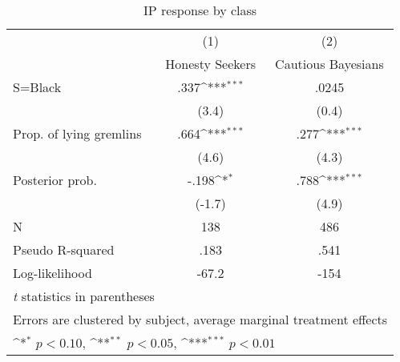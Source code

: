 \begin{table}[htbp]\centering
\def\sym#1{\ifmmode^{#1}\else\(^{#1}\)\fi}
\caption{IP response by class}
\begin{tabular}{l*{2}{c}}
\hline\hline
                &\multicolumn{1}{c}{(1)}&\multicolumn{1}{c}{(2)}\\
                &\multicolumn{1}{c}{Honesty Seekers}&\multicolumn{1}{c}{Cautious Bayesians}\\
\hline
S=Black         &     .337\sym{***}&    .0245         \\
                &    (3.4)         &    (0.4)         \\
Prop. of lying gremlins&     .664\sym{***}&     .277\sym{***}\\
                &    (4.6)         &    (4.3)         \\
Posterior prob. &    -.198\sym{*}  &     .788\sym{***}\\
                &   (-1.7)         &    (4.9)         \\
\hline
N               &      138         &      486         \\
Pseudo R-squared&     .183         &     .541         \\
Log-likelihood  &    -67.2         &     -154         \\
\hline\hline
\multicolumn{3}{l}{\footnotesize \textit{t} statistics in parentheses}\\
\multicolumn{3}{l}{\footnotesize Errors are clustered by subject, average marginal treatment effects}\\
\multicolumn{3}{l}{\footnotesize \sym{*} \(p<0.10\), \sym{**} \(p<0.05\), \sym{***} \(p<0.01\)}\\
\end{tabular}
\end{table}
